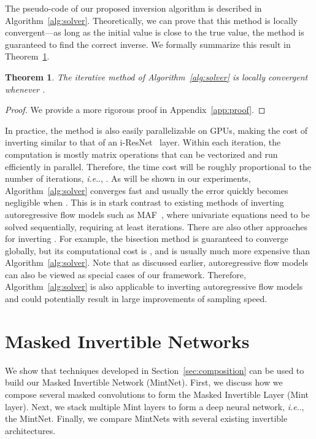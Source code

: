 \documentclass{article}
\makeatletter
\newtheorem{theorem}{Theorem}
\def\@onedot{\ifx\@let@token.\else.\null\fi\xspace}
\DeclareRobustCommand\onedot{\futurelet\@let@token\@onedot}
\newcommand{\algoref}[1]{Algorithm~\ref{#1}}
\newcommand{\secref}[1]{Section~\ref{#1}}
\newcommand{\thmref}[1]{Theorem~\ref{#1}}
\def\ie{\emph{i.e}\onedot}
\makeatother
\begin{document}
The pseudo-code of our proposed inversion algorithm is described in \algoref{alg:solver}. Theoretically, we can prove that this method is locally convergent---as long as the initial value is close to the true value, the method is guaranteed to find the correct inverse. We formally summarize this result in \thmref{thm:converge}.
\begin{theorem}\label{thm:converge}
The iterative method of \algoref{alg:solver} is locally convergent whenever .
\end{theorem}
\begin{proof}We provide a more rigorous proof in Appendix~\ref{app:proof}.
\end{proof}



In practice, the method is also easily parallelizable on GPUs, making the cost of inverting  similar to that of an i-ResNet~\cite{i-resnet} layer. Within each iteration, the computation is mostly matrix operations that can be vectorized and run efficiently in parallel. Therefore, the time cost will be roughly proportional to the number of iterations, \ie, . As will be shown in our experiments, \algoref{alg:solver} converges fast and usually the error quickly becomes negligible when . This is in stark contrast to existing methods of inverting autoregressive flow models such as MAF~\cite{maf}, where  univariate equations need to be solved sequentially, requiring at least  iterations. There are also other approaches for inverting . For example, the bisection method is guaranteed to converge globally, but its computational cost is , and is usually much more expensive than \algoref{alg:solver}. Note that as discussed earlier, autoregressive flow models can also be viewed as special cases of our framework. Therefore, \algoref{alg:solver} is also applicable to inverting autoregressive flow models and could potentially result in large improvements of sampling speed.


\section{Masked Invertible Networks}\label{sec:invnet}
We show that techniques developed in \secref{sec:composition} can be used to build our Masked Invertible Network (MintNet). First, we discuss how we compose several masked convolutions to form the Masked Invertible Layer (Mint layer). Next, we stack multiple Mint layers to form a deep neural network, \ie, the MintNet. Finally, we compare MintNets with several existing invertible architectures.
\end{document}
